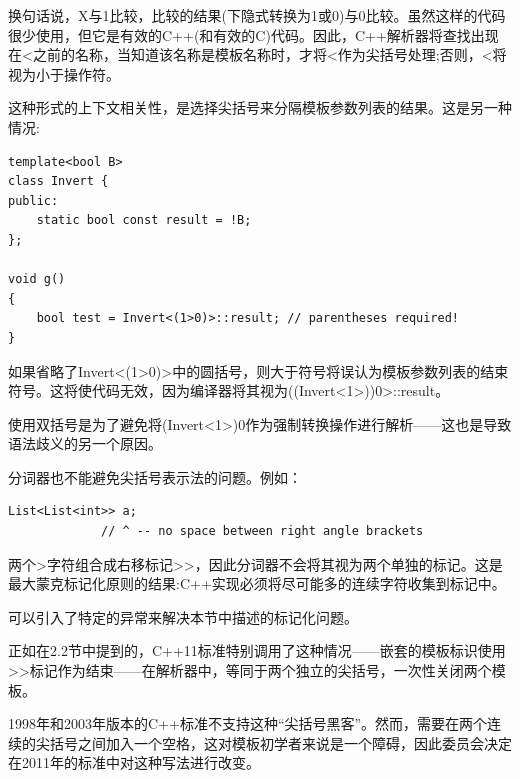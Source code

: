 换句话说，X与1比较，比较的结果(下隐式转换为1或0)与0比较。虽然这样的代码很少使用，但它是有效的C++(和有效的C)代码。因此，C++解析器将查找出现在<之前的名称，当知道该名称是模板名称时，才将<作为尖括号处理;否则，<将视为小于操作符。

这种形式的上下文相关性，是选择尖括号来分隔模板参数列表的结果。这是另一种情况:

\begin{lstlisting}[style=styleCXX]
template<bool B>
class Invert {
public:
	static bool const result = !B;
};

void g()
{
	bool test = Invert<(1>0)>::result; // parentheses required!
}
\end{lstlisting}

如果省略了Invert<(1>0)>中的圆括号，则大于符号将误认为模板参数列表的结束符号。这将使代码无效，因为编译器将其视为((Invert<1>))0>::result。

\begin{tcolorbox}[colback=webgreen!5!white,colframe=webgreen!75!black]
\hspace*{0.75cm}使用双括号是为了避免将(Invert<1>)0作为强制转换操作进行解析——这也是导致语法歧义的另一个原因。
\end{tcolorbox}

分词器也不能避免尖括号表示法的问题。例如：

\begin{lstlisting}[style=styleCXX]
List<List<int>> a;
			 // ^ -- no space between right angle brackets
\end{lstlisting}

两个>字符组合成右移标记>{}>，因此分词器不会将其视为两个单独的标记。这是最大蒙克标记化原则的结果:C++实现必须将尽可能多的连续字符收集到标记中。

\begin{tcolorbox}[colback=webgreen!5!white,colframe=webgreen!75!black]
\hspace*{0.75cm}可以引入了特定的异常来解决本节中描述的标记化问题。
\end{tcolorbox}

正如在2.2节中提到的，C++11标准特别调用了这种情况——嵌套的模板标识使用>{}>标记作为结束——在解析器中，等同于两个独立的尖括号，一次性关闭两个模板。

\begin{tcolorbox}[colback=webgreen!5!white,colframe=webgreen!75!black]
\hspace*{0.75cm}1998年和2003年版本的C++标准不支持这种“尖括号黑客”。然而，需要在两个连续的尖括号之间加入一个空格，这对模板初学者来说是一个障碍，因此委员会决定在2011年的标准中对这种写法进行改变。
\end{tcolorbox}

